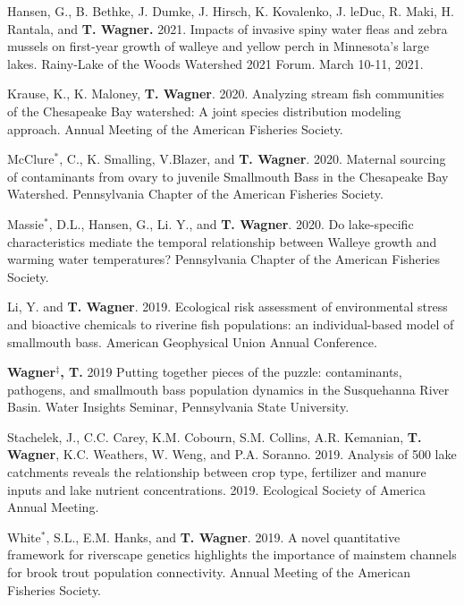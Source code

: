 \documentclass[10pt]{article}
\begin{document}
\begin{flushleft}
\begin{etaremune}
\item Hansen, G., B. Bethke, J. Dumke, J. Hirsch, K. Kovalenko, J. leDuc, R. Maki, H. Rantala, and \textbf{T. Wagner.} 2021. Impacts of invasive spiny water fleas and zebra mussels on first-year growth of walleye and yellow perch in Minnesota’s large lakes. Rainy-Lake of the Woods Watershed 2021 Forum. March 10-11, 2021.

\item Krause, K., K. Maloney, \textbf{T. Wagner}. 2020. Analyzing stream fish communities of the Chesapeake Bay watershed: A joint species distribution modeling approach. Annual Meeting of the American Fisheries Society. 

\item McClure$^*$, C., K. Smalling, V.Blazer, and \textbf{T. Wagner}. 2020. Maternal sourcing of contaminants from ovary to juvenile Smallmouth Bass in the Chesapeake Bay Watershed. Pennsylvania Chapter of the American Fisheries Society.

\item Massie$^*$, D.L., Hansen, G., Li. Y., and \textbf{T. Wagner}. 2020. Do lake-specific characteristics mediate the temporal relationship between Walleye growth and warming water temperatures? Pennsylvania Chapter of the American Fisheries Society.

\item Li, Y. and \textbf{T. Wagner}. 2019. Ecological risk assessment of environmental stress and bioactive chemicals to riverine fish populations: an individual-based model of smallmouth bass. American Geophysical Union Annual Conference.

\item \textbf{Wagner$^\ddagger$, T.} 2019 Putting together pieces of the puzzle: contaminants, pathogens, and smallmouth bass population dynamics in the Susquehanna River Basin. Water Insights Seminar, Pennsylvania State University. 

\item Stachelek, J., C.C. Carey, K.M. Cobourn, S.M. Collins, A.R. Kemanian, \textbf{T. Wagner}, K.C. Weathers, W. Weng, and P.A. Soranno. 2019. Analysis of 500 lake catchments reveals the relationship between crop type, fertilizer and manure inputs and lake nutrient concentrations. 2019. Ecological Society of America Annual Meeting.

\item White$^*$, S.L., E.M. Hanks, and \textbf{T. Wagner}. 2019. A novel quantitative framework for riverscape genetics highlights the importance of mainstem channels for brook trout population connectivity. Annual Meeting of the American Fisheries Society.


\end{etaremune}
\end{flushleft}
\end{document}
